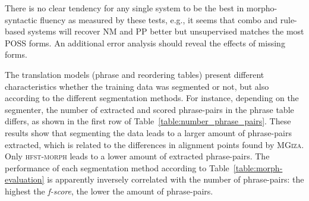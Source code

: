 \documentclass[free]{flammie}
\begin{document}
There is no clear tendency for any single system to be the best in morpho-syntactic fluency as measured by these tests, e.g., it seems that combo and rule-based systems will recover NM and PP better but unsupervised matches the most POSS forms.
An additional error analysis should reveal the effects of missing forms.



The translation models (phrase and reordering tables) present different characteristics whether the training data was segmented or not, but also according to the different segmentation methods. For instance, depending on the segmenter, the number of extracted and scored phrase-pairs in the phrase table differs, as shown in the first row of Table~\ref{table:number_phrase_pairs}.
These results show that segmenting the data leads to a larger amount of phrase-pairs extracted, which is related to the differences in alignment points found by \textsc{MGiza}.
Only \textsc{hfst-morph} leads to a lower amount of extracted phrase-pairs. The performance of each segmentation method according to Table~\ref{table:morph-evaluation} is apparently inversely correlated with the number of phrase-pairs: the highest the \textit{f-score}, the lower the amount of phrase-pairs. 

\begin{table}
\scriptsize{
    }
\end{table}
\end{document}
